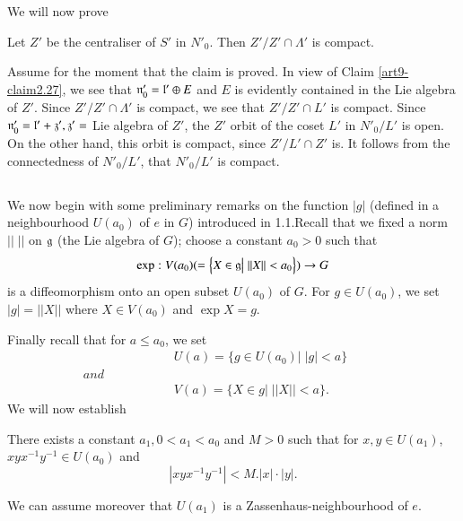 We will now prove

\setcounter{claim}{27}
\begin{claim}\label{art9-claim2.28}
Let $Z'$ be the centraliser of $S'$ in $N'_0$. Then $Z'/ Z' \cap \Lambda'$ is compact.
\end{claim}

Assume for the moment that the claim is proved. In view of Claim \ref{art9-claim2.27}, we see that $\mathfrak{n}'_0 = \mathfrak{l}' \oplus E$ and $E$ is evidently contained in the Lie algebra of $Z'$. Since $Z'/Z' \cap\Lambda'$ is compact, we see that $Z'/Z' \cap L'$ is compact. Since $\mathfrak{n}'_0 = \mathfrak{l}' + \mathfrak{z}', \mathfrak{z}' =$ Lie algebra of $Z'$, the $Z'$ orbit of the coset $L'$ in $N'_0/L'$ is open. On the other hand, this orbit is compact, since $Z'/L' \cap Z'$ is. It follows from the connectedness of $N'_0/L'$, that $N'_0/L'$ is compact.

\setcounter{subsection}{28}
\subsection{}\label{art9-subsec2.29}
We now begin with some preliminary remarks on the function $|g|$ (defined in a neighbourhood $U(a_0)$ of $e$ in $G$) introduced in 1.1.\pageoriginale Recall that we fixed a norm $||\;||$ on $\mathfrak{g}$ (the Lie algebra of $G$); choose a constant $a_0 > 0$ such that 
$$
\exp : V (a_0) ( = \left\{X \in \mathfrak{g} \big| \;||X || < a_0 \right\}) \to G
$$
is a diffeomorphism onto an open subset $U (a_0)$ of $G$. For $g \in U (a_0)$, we set $|g| = ||X||$ where $X \in V(a_0)$ and $\exp X = g$.

Finally recall that for $a \leqslant a_0$, we set
\begin{align*}
& U (a)  = \{g \in U(a_0) \big| \; |g| < a\}\\[-0.2cm]
and \hspace{2cm} & \hspace{7cm} \\[-0.1cm]
& V(a)  = \{X \in g \big| \; ||X|| < a\}.
\end{align*}
We will now establish

\setcounter{lemma}{29}
\begin{lemma}\label{art9-lem2.30}
There exists a constant $a_1, 0 < a_1 < a_0$ and $M > 0$ such that for $x, y \in U (a_1)$, $xyx^{-1} y^{-1} \in U (a_0)$ and 
$$
|xyx^{-1} y^{-1}| < M. |x| \cdot |y|.
$$
\end{lemma}

We can assume moreover that $U (a_1)$ is a Zassenhaus-neighbourhood of $e$.

